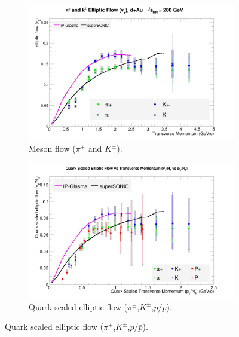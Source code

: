 \begin{figure}[hbtp]
\centering
    \begin{subfigure}[h]{0.48\textwidth}
    \centering
    \includegraphics[width=1\textwidth]{results/v2mesons.jpg}

    \caption{Meson flow ($\pi^{\pm}$ and $K^{\pm}$).}
    \label{fig:smesonflow}
	\end{subfigure}
    \begin{subfigure}[h]{0.48\textwidth}
    \centering
    \includegraphics[width=1\textwidth]{results/v2NqvspTwmodels.jpg}
    \caption{Quark scaled elliptic flow ($\pi^{\pm}$,$K^{\pm}$,$p/\bar{p}$).}
    \label{fig:qscalemesonflow}


\end{subfigure}
\end{figure}

